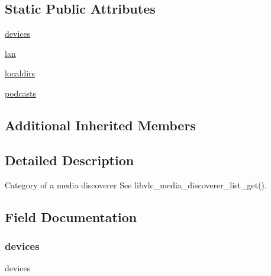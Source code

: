 \subsection*{Static Public Attributes}
\begin{DoxyCompactItemize}
\item 
\hyperlink{classvlc_1_1_media_discoverer_category_aa4b88f24716e66e8d41400b00e8ae8ae}{devices}
\item 
\hyperlink{classvlc_1_1_media_discoverer_category_a4e224df013b3fd4f0de54126186e75de}{lan}
\item 
\hyperlink{classvlc_1_1_media_discoverer_category_ae6527ee55432ca2b1bdec9063dd9775c}{localdirs}
\item 
\hyperlink{classvlc_1_1_media_discoverer_category_a94a26848801d03ca2533b6a41c6587e8}{podcasts}
\end{DoxyCompactItemize}
\subsection*{Additional Inherited Members}


\subsection{Detailed Description}
\begin{DoxyVerb}Category of a media discoverer
See libvlc_media_discoverer_list_get().
\end{DoxyVerb}
 

\subsection{Field Documentation}
\mbox{\label{classvlc_1_1_media_discoverer_category_aa4b88f24716e66e8d41400b00e8ae8ae}} 
\subsubsection{\texorpdfstring{devices}{devices}}
{\footnotesize\ttfamily devices\hspace{0.3cm}{\ttfamily [static]}}

\mbox{\label{classvlc_1_1_media_discoverer_category_a4e224df013b3fd4f0de54126186e75de}} 
